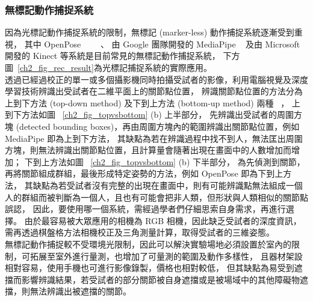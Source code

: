 \subsubsection{無標記動作捕捉系統}
因為光標記動作捕捉系統的限制，無標記 (marker-less) 動作捕捉系統逐漸受到重視，
其中 OpenPose ~\cite{8765346}~\cite{wei2016cpm}~\cite{simon2017hand}~\cite{cao2017realtime}、
由 Google 團隊開發的 MediaPipe ~\cite{mediapipe_web} 及由 Microsoft 開發的 Kinect 等系統是目前常見的無標記動作捕捉系統，
下方圖~\ref{ch2_fig_rec_result}為光標記捕捉系統的實際應用。 \\
透過已經過校正的單一或多個攝影機同時拍攝受試者的影像，利用電腦視覺及深度學習技術辨識出受試者在二維平面上的關節點位置，
辨識關節點位置的方法分為上到下方法 (top-down method) 及下到上方法 (bottom-up method) 兩種 ~\cite{nie2019single}，
上到下方法如圖 ~\ref{ch2_fig_topvsbottom} (b) 上半部分，
先辨識出受試者的周圍方塊 (detected bounding boxes)，再由周圍方塊內的範圍辨識出關節點位置，例如 MediaPipe 即為上到下方法，
其缺點為若在辨識過程中找不到人，無法匡出周圍方塊，則無法辨識出關節點位置，且計算量會隨著出現在畫面中的人數增加而增加；
下到上方法如圖 ~\ref{ch2_fig_topvsbottom} (b) 下半部分，
為先偵測到關節，再將關節組成群組，最後形成特定姿勢的方法，例如 OpenPose 即為下到上方法，
其缺點為若受試者沒有完整的出現在畫面中，則有可能辨識點無法組成一個人的群組而被判斷為一個人，且也有可能會把非人類，但形狀與人類相似的關節點誤認，
因此，要使用哪一個系統，需經過學者們仔細思索自身需求，再進行選擇。
由於最容易被大眾應用的相機為 RGB 相機，因此缺乏受試者的深度資訊，需再透過棋盤格方法相機校正及三角測量計算，取得受試者的三維姿態。 \\
無標記動作捕捉較不受環境光限制，因此可以解決實驗場地必須設置於室內的限制，可拓展至室外進行量測，也增加了可量測的範圍及動作多樣性，
且器材架設相對容易，使用手機也可進行影像錄製，價格也相對較低，
但其缺點為易受到遮擋而影響辨識結果，若受試者的部分關節被自身遮擋或是被場域中的其他障礙物遮擋，則無法辨識出被遮擋的關節。 \\

